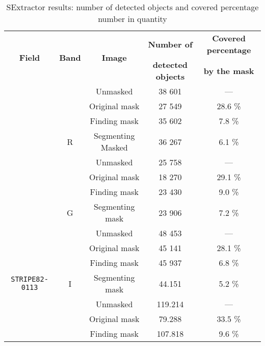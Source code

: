 \documentclass{article}
\begin{document}
\begin{table}[h!]
  \centering
  \caption{SExtractor results: number of detected objects and covered percentage number in quantity}
  \begin{tabular}{c|c|c|c|c}
    \cline{1-5}
    \multirow{2}{*}{\bf Field} & \multirow{2}{*}{\bf Band} & \multirow{2}{*}{\bf Image} &{\bf Number of} & {\bf Covered percentage} \\
    & & & {\bf detected objects} & {\bf by the mask} \\
    \hline
    \cellcolor{gray!20} & \cellcolor{red!20} & Unmasked & 38 601 & --- \\
    \cline{3-5}
    \cellcolor{gray!20} & \cellcolor{red!20} & Original mask & 27 549 & 28.6 \%\\
    \cline{3-5}
    \cellcolor{gray!20} & \cellcolor{red!20} & Finding mask & 35 602 & 7.8 \%\\
    \cline{3-5}
    \cellcolor{gray!20} & \multirow{-4}{*}{\cellcolor{red!20}R} & Segmenting Masked & 36 267 & 6.1 \%\\
    \cline{2-5}
    \cellcolor{gray!20} & \cellcolor{green!20} & Unmasked & 25 758 & --- \\
    \cline{3-5}
    \cellcolor{gray!20} & \cellcolor{green!20} & Original mask & 18 270 & 29.1 \%\\
    \cline{3-5}
    \cellcolor{gray!20} & \cellcolor{green!20} & Finding mask & 23 430 & 9.0 \%\\
    \cline{3-5}
    \cellcolor{gray!20} & \multirow{-4}{*}{\cellcolor{green!20}G} & Segmenting mask & 23 906 & 7.2 \%\\
    \cline{2-5}
    \cellcolor{gray!20} & \cellcolor{blue!20} & Unmasked & 48 453 & --- \\
    \cline{3-5}
    \cellcolor{gray!20} & \cellcolor{blue!20} & Original mask & 45 141 & 28.1 \%\\
    \cline{3-5}
    \cellcolor{gray!20} & \cellcolor{blue!20} & Finding mask & 45 937 & 6.8 \%\\
    \cline{3-5}
    \multirow{-9}{*}{\cellcolor{gray!20} \texttt{STRIPE82-0113}} & \multirow{-4}{*}{\cellcolor{blue!20}I} & Segmenting mask & 44.151 & 5.2 \%\\
    \hline
    \cellcolor{gray!20} & \cellcolor{red!20} & Unmasked & 119.214 & --- \\
    \cline{3-5}
    \cellcolor{gray!20} & \cellcolor{red!20} & Original mask & 79.288 & 33.5 \%\\
    \cline{3-5}
    \cellcolor{gray!20} & \cellcolor{red!20} & Finding mask & 107.818 & 9.6 \%\\

\end{tabular}
\end{table}
\end{document}

